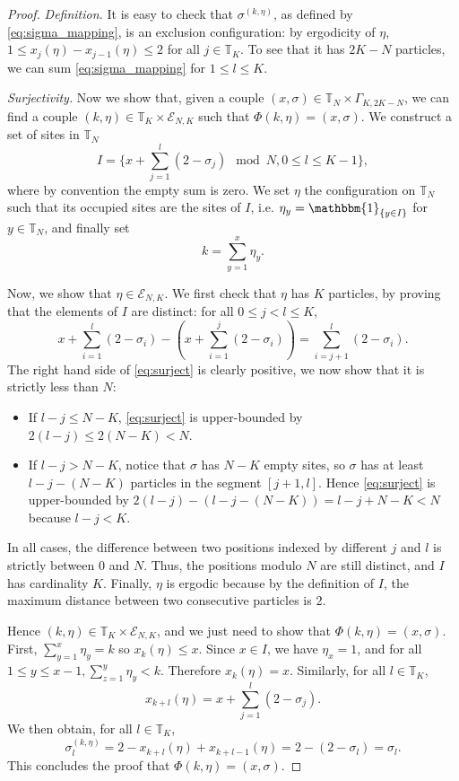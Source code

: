 \documentclass[11pt,a4paper]{article}
\newcommand{\T}{\mathbb{T}}
\newcommand{\un}{\mathbbm{1}}
\newcommand{\eqs}[1]{\begin{equation}#1\end{equation}}
\newcommand{\eq}[2]{\begin{equation}\label{#1}#2\end{equation}}
\begin{document}
\begin{proof}
\textit{Definition. }It is easy to check that $\sigma^{(k,\eta)}$, as defined by \eqref{eq:sigma_mapping}, is an exclusion configuration: by ergodicity of $\eta$, $1 \le x_j(\eta) - x_{j-1}(\eta) \le 2$ for all $j \in \T_K$. To see that it has $2K-N$ particles, we can sum \eqref{eq:sigma_mapping} for $1 \le l \le K$.

\textit{Surjectivity. }Now we show that, given a couple $(x, \sigma) \in \T_N \times \Gamma_{K,2K-N}$, we can find a couple $(k, \eta) \in \T_K \times \mathcal{E}_{N,K}$ such that $\Phi(k,\eta) = (x, \sigma)$. We construct a set of sites in $\T_N$ 
\eqs{I = \Big\{x + \sum_{j = 1}^l (2- \sigma_j) \mod N, 0\le l \le K-1\Big\},}
where by convention the empty sum is zero. We set $\eta$ the configuration on $\T_N$ such that its occupied sites are the sites of $I$, i.e. $\eta_y = \un_{\{y \in I\}}$ for $y \in \T_N$, and finally set 
\eqs{k = \sum_{y=1}^x \eta_y.}

Now, we show that $\eta \in \mathcal{E}_{N,K}$.
We first check that $\eta$ has $K$ particles, by proving that the elements of $I$ are distinct: for all $0 \le j < l \le K$, 
\eq{eq:surject}{x + \sum_{i = 1}^l (2-\sigma_i) - \left(x + \sum_{i = 1}^j (2-\sigma_i)\right)  = \sum_{i = j+1}^l (2-\sigma_i).}
The right hand side of \eqref{eq:surject} is clearly positive, we now show that it is strictly less than $N$:
\begin{itemize}
\item If $l-j \le N-K$, \eqref{eq:surject} is upper-bounded by $2(l-j) \le 2(N-K) < N$. 
\item If $l-j > N-K$, notice that $\sigma$ has $N-K$ empty sites, so $\sigma$ has at least $l-j - (N-K)$ particles in the segment $[j+1,l]$. Hence \eqref{eq:surject} is upper-bounded by $2(l-j) - (l-j-(N-K)) = l-j + N-K < N$ because $l-j < K$. 
\end{itemize}
In all cases, the difference between two positions indexed by different $j$ and $l$ is strictly between 0 and $N$. Thus, the positions modulo $N$ are still distinct, and $I$ has cardinality $K$.
Finally, $\eta$ is ergodic because by the definition of $I$, the maximum distance between two consecutive particles is 2. 

Hence $(k,\eta) \in \T_K \times\mathcal{E}_{N,K}$, and we just need to show that $\Phi(k,\eta) = (x,\sigma)$. 
First, $\sum_{y=1}^x \eta_y = k$ so $x_k(\eta) \le x$. Since $x\in I$, we have  $\eta_x = 1$, and for all $1 \le y \le x-1, \sum_{z=1}^y \eta_y < k$. Therefore $x_k(\eta) = x$. Similarly, for all $l \in \T_K$, 
\eqs{x_{k+l}(\eta) = x+ \sum_{j=1}^l (2-\sigma_j).} 
We then obtain, for all $l \in \T_K$, 
\eqs{\sigma_l^{(k,\eta)} = 2 - x_{k+l}(\eta) + x_{k+l-1}(\eta) = 2 -(2 - \sigma_{l}) = \sigma_l.}
This concludes the proof that $\Phi(k,\eta) = (x,\sigma)$.


\end{proof}
\end{document}
